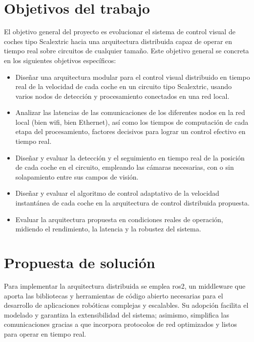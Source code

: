 \section{Objetivos del trabajo}
\label{sec:obxectivos}

El objetivo general del proyecto es evolucionar el sistema de control visual de coches tipo Scalextric hacia una arquitectura distribuida capaz de operar en tiempo real sobre circuitos de cualquier tamaño. Este objetivo general se concreta en los siguientes objetivos específicos:

\begin{itemize}
    \item Diseñar una arquitectura modular para el control visual distribuido en tiempo real de la velocidad de cada coche en un circuito tipo Scalextric, usando varios nodos de detección y procesamiento conectados en una red local.

    \item Analizar las latencias de las comunicaciones de los diferentes nodos en la red local (bien wifi, bien Ethernet), así como los tiempos de computación de cada etapa del procesamiento, factores decisivos para lograr un control efectivo en tiempo real.

    \item Diseñar y evaluar la detección y el seguimiento en tiempo real de la posición de cada coche en el circuito, empleando las cámaras necesarias, con o sin solapamiento entre sus campos de visión.

    \item Diseñar y evaluar el algoritmo de control adaptativo de la velocidad instantánea de cada coche en la arquitectura de control distribuida propuesta.

    \item Evaluar la arquitectura propuesta en condiciones reales de operación, midiendo el rendimiento, la latencia y la robustez del sistema.
\end{itemize}

\section{Propuesta de solución}
\label{sec:proposta}

Para implementar la arquitectura distribuida se emplea \gls{ros2}, un middleware que aporta las bibliotecas y herramientas de código abierto necesarias para el desarrollo de aplicaciones robóticas complejas y escalables. Su adopción facilita el modelado %
y garantiza la extensibilidad del sistema; %
asimismo, simplifica %
las comunicaciones gracias a que incorpora protocolos de red optimizados y listos para operar en tiempo real.

